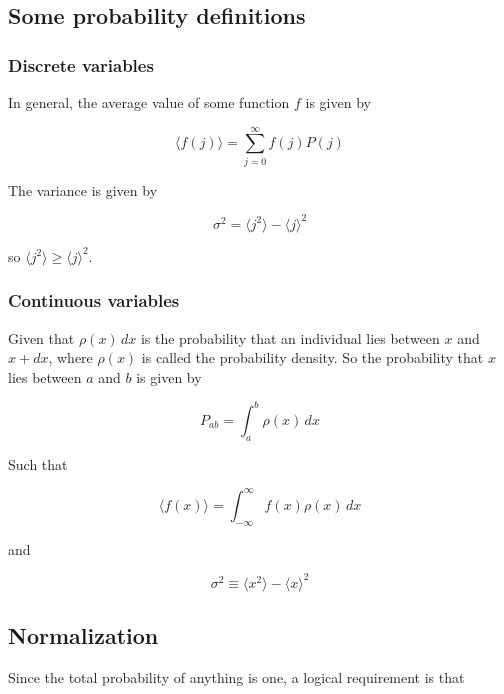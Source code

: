 \documentclass[a4paper]{article}
\begin{document}
\subsection{Some probability definitions}

\subsubsection{Discrete variables}

In general, the average value of some function $f$ is given by

\begin{equation}
    \langle f(j) \rangle = \sum_{j=0}^{\infty}f(j)P(j)
\end{equation}

The variance is given by

\begin{equation}
    \sigma^2 = \langle j^2 \rangle - \langle j \rangle^2
\end{equation}

so $\langle j^2 \rangle \ge \langle j \rangle^2$.

\subsubsection{Continuous variables}

Given that $\rho(x)\,dx$ is the probability that an individual lies between $x$ and $x+dx$, where $\rho(x)$ is called the probability density. So the probability that $x$ lies between $a$ and $b$ is given by

\begin{equation}
    P_{ab} = \int_{a}^{b}\rho(x)\,dx
\end{equation}

Such that

\begin{equation}
    \langle f(x) \rangle = \int_{-\infty}^{\infty}f(x)\rho(x)\,dx
\end{equation}

and 

\begin{equation}
    \sigma^2 \equiv \langle x^2 \rangle - \langle x \rangle^2
\end{equation}

\subsection{Normalization}

Since the total probability of anything is one, a logical requirement is that
\end{document}
